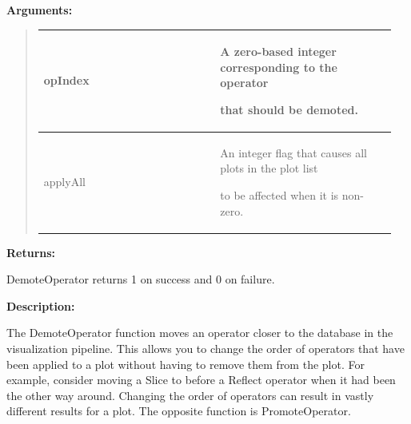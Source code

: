 \documentclass[letterpaper,10pt,english]{sphinxmanual}
\begin{document}
\begin{DUlineblock}{0em}
\item[] 
\item[] \textbf{Arguments:}
\end{DUlineblock}
\begin{quote}

\begin{tabular}{|p{0.475\linewidth}|p{0.475\linewidth}|}
\hline

opIndex
 & 
\begin{DUlineblock}{0em}
\item[] A zero-based integer corresponding to the operator
\item[] that should be demoted.
\end{DUlineblock}
\\
\hline
applyAll
 & 
\begin{DUlineblock}{0em}
\item[] An integer flag that causes all plots in the plot list
\item[] to be affected when it is non-zero.
\end{DUlineblock}
\\
\hline\end{tabular}

\end{quote}

\begin{DUlineblock}{0em}
\item[] 
\item[] \textbf{Returns:}
\item[] DemoteOperator returns 1 on success and 0 on failure.
\item[] 
\item[] \textbf{Description:}
\item[] The DemoteOperator function moves an operator closer to the database in
the visualization pipeline. This allows you to change the order of
operators that have been applied to a plot without having to remove them
from the plot. For example, consider moving a Slice to before a Reflect
operator when it had been the other way around. Changing the order of
operators can result in vastly different results for a plot. The opposite
function is PromoteOperator.
\end{DUlineblock}

\begin{DUlineblock}{0em}
\item[] 
\end{DUlineblock}
\end{document}
